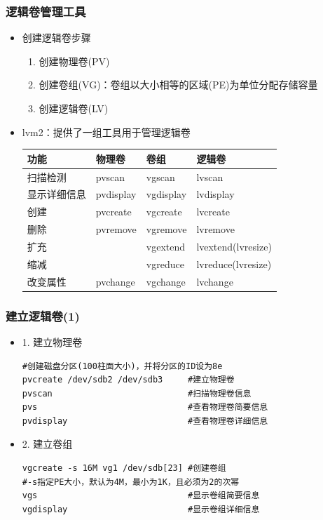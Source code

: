 \documentclass[xcolor=svgnames,presentation]{beamer}
\begin{document}
\begin{frame}
\frametitle{逻辑卷管理工具}
\label{sec-5-3}
\begin{itemize}

\item 创建逻辑卷步骤
\label{sec-5-3-1}%
\begin{enumerate}
\item 创建物理卷(PV)
\item 创建卷组(VG)：卷组以大小相等的区域(PE)为单位分配存储容量
\item 创建逻辑卷(LV)
\end{enumerate}

\item lvm2：提供了一组工具用于管理逻辑卷\\
\label{sec-5-3-2}%
\begin{center}
\begin{tabular}{llll}
 功能          &  物理卷     &  卷组       &  逻辑卷              \\
\hline
 扫描检测      &  pvscan     &  vgscan     &  lvscan              \\
 显示详细信息  &  pvdisplay  &  vgdisplay  &  lvdisplay           \\
 创建          &  pvcreate   &  vgcreate   &  lvcreate            \\
 删除          &  pvremove   &  vgremove   &  lvremove            \\
 扩充          &             &  vgextend   &  lvextend(lvresize)  \\
 缩减          &             &  vgreduce   &  lvreduce(lvresize)  \\
 改变属性      &  pvchange   &  vgchange   &  lvchange            \\
\end{tabular}
\end{center}


\end{itemize} %
\end{frame}
\begin{frame}[fragile]
\frametitle{建立逻辑卷(1)}
\label{sec-5-4}
\begin{itemize}

\item 1. 建立物理卷\\
\label{sec-5-4-1}%
\begin{verbatim}
#创建磁盘分区(100柱面大小)，并将分区的ID设为8e
pvcreate /dev/sdb2 /dev/sdb3     #建立物理卷
pvscan                           #扫描物理卷信息
pvs                              #查看物理卷简要信息
pvdisplay                        #查看物理卷详细信息
\end{verbatim}

\item 2. 建立卷组\\
\label{sec-5-4-2}%
\begin{verbatim}
vgcreate -s 16M vg1 /dev/sdb[23] #创建卷组
#-s指定PE大小，默认为4M，最小为1K，且必须为2的次幂
vgs                              #显示卷组简要信息
vgdisplay                        #显示卷组详细信息
\end{verbatim}
\end{itemize} %
\end{frame}
\end{document}
